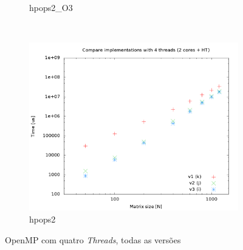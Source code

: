 \documentclass[a4paper, 12pt]{article}
\begin{document}
\begin{figure}[H]
\begin{subfigure}[H]{0.5\textwidth}
        \caption{hpops2\_O3}
        \label{fig:hpops2_O3_cmp_2t}
    \end{subfigure}
    ~ %
    \begin{subfigure}[H]{0.5\textwidth}
        \includegraphics[width=\textwidth]{hpops2_cmp_versions-4t}
        \caption{hpops2}
        \label{fig:hpops2_cmp_2t}
    \end{subfigure}%
    \caption{OpenMP com quatro \textit{Threads}, todas as versões}\label{fig:animals}
\end{figure}

\newpage
\end{document}
